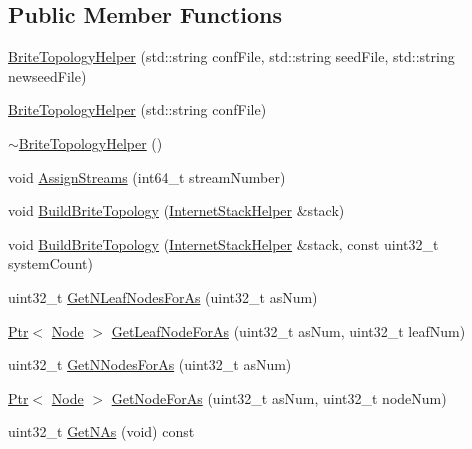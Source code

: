 \subsection*{Public Member Functions}
\begin{DoxyCompactItemize}
\item 
\hyperlink{classns3_1_1BriteTopologyHelper_ab9690d584c8ee3993226e797a2a064fd}{Brite\+Topology\+Helper} (std\+::string conf\+File, std\+::string seed\+File, std\+::string newseed\+File)
\item 
\hyperlink{classns3_1_1BriteTopologyHelper_a038eb6f7f39833e97ea7bff194fb83ce}{Brite\+Topology\+Helper} (std\+::string conf\+File)
\item 
\hyperlink{classns3_1_1BriteTopologyHelper_a37efcd6166a196679a0655637c03467f}{$\sim$\+Brite\+Topology\+Helper} ()
\item 
void \hyperlink{classns3_1_1BriteTopologyHelper_a019f40a1a4eee18a40dafc5f449ab69a}{Assign\+Streams} (int64\+\_\+t stream\+Number)
\item 
void \hyperlink{classns3_1_1BriteTopologyHelper_a44c7d4b65e9200851ef20283f51f0e84}{Build\+Brite\+Topology} (\hyperlink{classns3_1_1InternetStackHelper}{Internet\+Stack\+Helper} \&stack)
\item 
void \hyperlink{classns3_1_1BriteTopologyHelper_add00a2bbadc06d39828c5005f59dbf0d}{Build\+Brite\+Topology} (\hyperlink{classns3_1_1InternetStackHelper}{Internet\+Stack\+Helper} \&stack, const uint32\+\_\+t system\+Count)
\item 
uint32\+\_\+t \hyperlink{classns3_1_1BriteTopologyHelper_a71614af65e3937fa96b9e68d525822c4}{Get\+N\+Leaf\+Nodes\+For\+As} (uint32\+\_\+t as\+Num)
\item 
\hyperlink{classns3_1_1Ptr}{Ptr}$<$ \hyperlink{classns3_1_1Node}{Node} $>$ \hyperlink{classns3_1_1BriteTopologyHelper_ad451a52a7b0c3359d9433a566c697314}{Get\+Leaf\+Node\+For\+As} (uint32\+\_\+t as\+Num, uint32\+\_\+t leaf\+Num)
\item 
uint32\+\_\+t \hyperlink{classns3_1_1BriteTopologyHelper_a712242b921ce5db5cd7f5d8f1e932d68}{Get\+N\+Nodes\+For\+As} (uint32\+\_\+t as\+Num)
\item 
\hyperlink{classns3_1_1Ptr}{Ptr}$<$ \hyperlink{classns3_1_1Node}{Node} $>$ \hyperlink{classns3_1_1BriteTopologyHelper_a62de119a24136b4db52975f8df2525cf}{Get\+Node\+For\+As} (uint32\+\_\+t as\+Num, uint32\+\_\+t node\+Num)
\item 
uint32\+\_\+t \hyperlink{classns3_1_1BriteTopologyHelper_a45da18fb1d6b8ab1419c700e326a3433}{Get\+N\+As} (void) const 

\end{DoxyCompactItemize}
